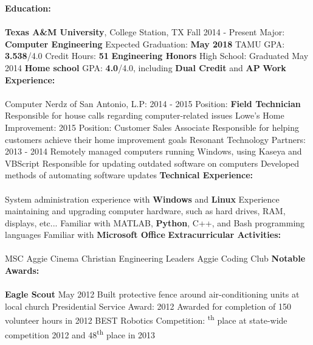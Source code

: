 \documentclass[12pt]{article}
\newcommand{\upspace}{\vspace{1.5px}}
\newcommand{\zzz}[1]{\upspace \0 \textbf{#1} \\ \vspace{-12px} \hrulefill \vspace{-2px} \\ }
\newcommand{\aaa}{\upspace \1}
\newcommand{\bbb}{\upspace \2}
\begin{document}
\begin{flushleft}
\begin{outline}[compactitem]
\zzz{Education:}
	\aaa \textbf{Texas A\&M University}, College Station, TX \hfill Fall 2014 - Present
		\bbb Major: \textbf{Computer Engineering}
		\bbb Expected Graduation: \textbf{May 2018}
		\bbb TAMU GPA: \textbf{3.538}/4.0
		\bbb Credit Hours: \textbf{51}
		\bbb \textbf{Engineering Honors}
	\aaa High School: \hfill Graduated May 2014
		\bbb \textbf{Home school}
		\bbb GPA: \textbf{4.0}/4.0, including \textbf{Dual Credit} and \textbf{AP}
\zzz{Work Experience:}
	\aaa Computer Nerdz of San Antonio, L.P: \hfill 2014 - 2015
		\bbb Position: \textbf{Field Technician}
		\bbb Responsible for house calls regarding computer-related issues
	\aaa Lowe's Home Improvement: \hfill 2015
		\bbb Position: Customer Sales Associate
		\bbb Responsible for helping customers achieve their home improvement goals
	\aaa Resonant Technology Partners: \hfill 2013 - 2014
		\bbb Remotely managed computers running Windows, using Kaseya and VBScript
		\bbb Responsible for updating outdated software on computers
		\bbb Developed methods of automating software updates
\zzz{Technical Experience:}
	\aaa System administration experience with \textbf{Windows} and \textbf{Linux}
	\aaa Experience maintaining and upgrading computer hardware, such as hard drives, RAM, displays, etc...
	\aaa Familiar with MATLAB, \textbf{Python}, C++, and Bash programming languages
	\aaa Familiar with \textbf{Microsoft Office}
\zzz{Extracurricular Activities:}
	\aaa MSC Aggie Cinema
	\aaa Christian Engineering Leaders
	\aaa Aggie Coding Club
\zzz{Notable Awards:}
	\aaa \textbf{Eagle Scout} \hfill May 2012
		\bbb Built protective fence around air-conditioning units at local church
	\aaa Presidential Service Award: \hfill 2012
		\bbb Awarded for completion of 150 volunteer hours in 2012
	\aaa BEST Robotics Competition:
		\bbb 5\textsuperscript{th} place at state-wide competition 2012 and 48\textsuperscript{th} place in 2013
\end{outline}
\end{flushleft}
\end{document}
